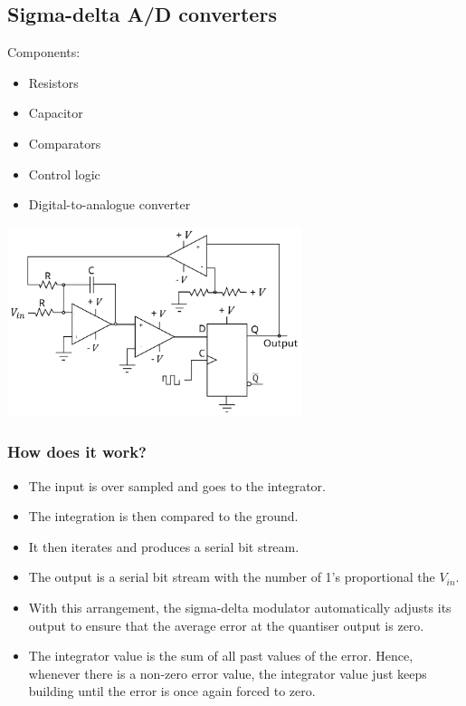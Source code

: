 \documentclass[11pt]{article}
\begin{document}
\subsection{Sigma-delta A/D converters}
\label{sec:org9212e2b}
Components:
\begin{itemize}
\item Resistors
\item Capacitor
\item Comparators
\item Control logic
\item Digital-to-analogue converter
\end{itemize}

\begin{center}
\includegraphics[height=15em]{./images/sigma-delta-a-d-converters.png}
\end{center}
\subsubsection{How does it work?}
\label{sec:org53e59e7}
\begin{itemize}
\item The input is over sampled and goes to the integrator.
\item The integration is then compared to the ground.
\item It then iterates and produces a serial bit stream.
\item The output is a serial bit stream with the number of 1's proportional the \(V_{in}\).
\item With this arrangement, the sigma-delta modulator automatically adjusts its output to ensure that the average error at the quantiser output is zero.
\item The integrator value is the sum of all past values of the error. Hence, whenever there is a non-zero error value, the integrator value just keeps building until the error is once again forced to zero.
\end{itemize}
\end{document}
